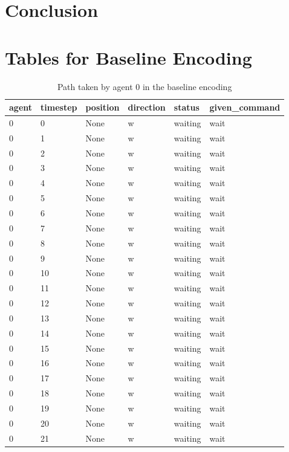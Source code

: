 \documentclass[12pt, a4paper]{llncs}
\begin{document}
\section{Conclusion}

\appendix

\section{Tables for Baseline Encoding}

\begin{table}[htbp]
  \centering
  \caption{Path taken by agent 0 in the baseline encoding}
  \label{tab:baseline0}
  \begin{tabular}{llllll}
    \toprule
    agent & timestep & position & direction & status & given\_command \\
    \midrule
    0 & 0 & None & w & waiting & wait \\
    0 & 1 & None & w & waiting & wait \\
    0 & 2 & None & w & waiting & wait \\
    0 & 3 & None & w & waiting & wait \\
    0 & 4 & None & w & waiting & wait \\
    0 & 5 & None & w & waiting & wait \\
    0 & 6 & None & w & waiting & wait \\
    0 & 7 & None & w & waiting & wait \\
    0 & 8 & None & w & waiting & wait \\
    0 & 9 & None & w & waiting & wait \\
    0 & 10 & None & w & waiting & wait \\
    0 & 11 & None & w & waiting & wait \\
    0 & 12 & None & w & waiting & wait \\
    0 & 13 & None & w & waiting & wait \\
    0 & 14 & None & w & waiting & wait \\
    0 & 15 & None & w & waiting & wait \\
    0 & 16 & None & w & waiting & wait \\
    0 & 17 & None & w & waiting & wait \\
    0 & 18 & None & w & waiting & wait \\
    0 & 19 & None & w & waiting	 & wait \\
    0 & 20 & None & w & waiting & wait \\
    0 & 21 & None & w & waiting & wait \\

\end{tabular}
\end{table}
\end{document}
